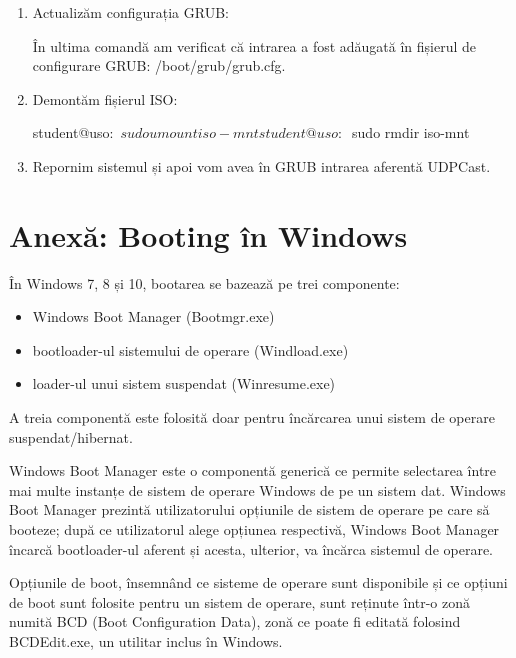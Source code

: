 \begin{enumerate}
	\item Actualizăm configurația GRUB:

\begin{screen}
student@uso:~$ sudo update-grub
Generating grub configuration file ...
[...]
done
student@uso:~$ grep UDPCast /boot/grub/grub.cfg
menuentry 'UDPCast' {
\end{screen}

În ultima comandă am verificat că intrarea a fost adăugată în fișierul de configurare GRUB: /boot/grub/grub.cfg.

	\item Demontăm fișierul ISO:

\begin{screen}
student@uso:~$ sudo umount iso-mnt
student@uso:~$ sudo rmdir iso-mnt
\end{screen}

	\item Repornim sistemul și apoi vom avea în GRUB intrarea aferentă UDPCast.
\end{enumerate}

\section{Anexă: Booting în Windows}
\label{sec:boot-init-win}

În Windows 7, 8 și 10, bootarea se bazează pe trei componente:

\begin{itemize}
	\item Windows Boot Manager (Bootmgr.exe)
	\item bootloader-ul sistemului de operare (Windload.exe)
	\item loader-ul unui sistem suspendat (Winresume.exe)
\end{itemize}

A treia componentă este folosită doar pentru încărcarea unui sistem de operare suspendat/hibernat.

Windows Boot Manager este o componentă generică ce permite selectarea între mai
multe instanțe de sistem de operare Windows de pe un sistem dat. Windows Boot
Manager prezintă utilizatorului opțiunile de sistem de operare pe care să
booteze; după ce utilizatorul alege opțiunea respectivă, Windows Boot Manager
încarcă bootloader-ul aferent și acesta, ulterior, va încărca sistemul de
operare.

Opțiunile de boot, însemnând ce sisteme de operare sunt disponibile și ce
opțiuni de boot sunt folosite pentru un sistem de operare, sunt reținute într-o
zonă numită BCD (Boot Configuration Data), zonă ce poate fi editată folosind
BCDEdit.exe, un utilitar inclus în Windows.

